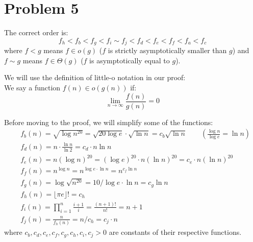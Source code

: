 \documentclass{article}
\begin{document}
\section{Problem 5}

  The correct order is:
  \[ f_h < f_b < f_g < f_i \sim f_j < f_d < f_e < f_f < f_a < f_c \]
  where $f < g$ means $f \in o(g)$ ($f$ is strictly asymptotically smaller than $g$) and $f \sim g$ means $f \in \Theta(g)$ ($f$ is asymptotically equal to $g$).

  We will use the definition of little-o notation in our proof: \\
  We say a function $f(n) \in o(g(n))$ if:
  \[ \lim_{n \to \infty} \frac{f(n)}{g(n)} = 0 \]

  Before moving to the proof, we will simplify some of the functions:
  \begin{align*}
    &f_b(n) = \sqrt{\log n^{20}} = \sqrt{20 \log e} \cdot \sqrt{\ln n} = c_b \sqrt{\ln n} \qquad \left( \frac{\log n}{\log e} = \ln n \right) \\
    &f_d(n) = n \cdot \frac{\ln n}{\ln 2} = c_d \cdot n \ln n \\
    &f_e(n) = n(\log n)^{20} = (\log e)^{20} \cdot n (\ln n)^{20} = c_e \cdot n (\ln n)^{20} \\
    &f_f(n) = n^{\log n} = n^{\log e \cdot \ln n} = n^{c_f \ln n} \\
    &f_g(n) = \log \sqrt{n^{20}} = 10/\log e \cdot \ln n = c_g \ln n \\
    &f_h(n) = \lfloor \pi e \rfloor! = c_h \\
    &f_i(n) = \prod_{i=1}^{n} \frac{i + 1}{i} = \frac{(n + 1)!}{n!} = n + 1 \\
    &f_j(n) = \frac{n}{f_h(n)} = n / c_h = c_j \cdot n
  \end{align*}
  where $c_b, c_d, c_e, c_f, c_g, c_h, c_i, c_j > 0$ are constants of their respective functions.
\end{document}
